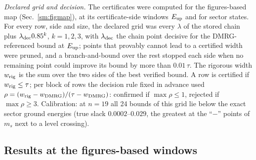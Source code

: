 \documentclass[aps,prx,onecolumn,10pt,nofootinbib,longbibliography,floatfix]{revtex4-2}
\theoremstyle{remark}
\newcommand{\Jz}{J_z}
\newcommand{\ms}{m_s}
\newcommand{\Czz}{\bar C_{zz}}
\begin{document}
\emph{Declared grid and decision.} The certificates were computed for the figures-based map (Sec.~\ref{sm:figmap}),
at its certificate-side windows $E_{\rm up}$ and for sector states. For every row, side and size, the declared grid was every $\lambda$ of the stored
chain plus $\lambda_{\rm dec}0.85^k$, $k=1,2,3$, with $\lambda_{\rm dec}$ the chain point decisive for the %
DMRG-referenced bound at $E_{\rm up}$; points that provably cannot lead to a certified width were pruned, and a
branch-and-bound over the rest stopped each side when no remaining point could improve its bound by more than
$0.01\,\tau$. The %
rigorous width $w_{\rm rig}$ is the sum over the two sides of the best verified bound. A row is certified if
$w_{\rm rig}\le\tau$; per block of rows the decision rule fixed in advance used $\rho=(w_{\rm rig}-w_{\rm
DMRG})/(\tau-w_{\rm DMRG})$: confirmed if $\max\rho\le1$, rejected if $\max\rho\ge3$. Calibration: at $n=19$ all 24 %
bounds of this grid lie below the exact sector ground energies (true slack $0.0002$--$0.029$, the greatest at the %
``$-$'' points of $\ms$ next to a level crossing).

\subsection{Results at the figures-based windows}
\def\SMcap{Rigorous certificates at the computed points where the figures-based map certifies $\ms$ and $\Czz$ ($n=57$: all %
of them; $n=115$: $\Jz=4.0$ and $6.0$). Proved interval: the values of the label allowed, for sector states, by the energy window at %
$E_{\rm up}$ (the certificate-side window of Sec.~\ref{sm:figmodel}), proved with exact lower bounds, ends rounded outward; $w_{\rm rig}/\tau$ its
width over the reference tolerance and $w_{\rm rig}/\tau_{\rm rf}$ over the reference-free tolerance ($6\%$ of the smaller end of the interval in absolute value), both rounded up; $w_{\rm DMRG}/\tau$ the DMRG-referenced width at the same window. Slack: DMRG energy minus verified lower bound %
at the winning field of each side (units of the exchange coupling; an upper bound on the true slack). Bold $\Jz$:
within $\tau$. For the public labels these rows are superseded by the intervals of Sec.~\ref{sm:public_exact}.}\def\SMlab{tab:rig_v2} %

\end{document}
